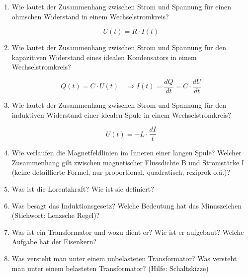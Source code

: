 
\begin{enumerate}
	\item Wie lautet der Zusammenhang zwischen Strom und Spannung für einen ohmschen Widerstand in einem Wechselstromkreis?
		\begin{solution}
			$$ U(t) = R\cdot I(t)$$
		\end{solution}
	\item Wie lautet der Zusammenhang zwischen Strom und Spannung für den kapazitiven Widerstand eines idealen Kondensators in einem Wechselstromkreis?
		\begin{solution}
			$$Q(t) = C\cdot U(t) \quad \Rightarrow I(t) = \frac{dQ}{dt} = C\cdot\frac{dU}{dt}$$
		\end{solution}
	\item Wie lautet der Zusammenhang zwischen Strom und Spannung für den induktiven Widerstand einer idealen Spule in einem Wechselstromkreis?
		\begin{solution}
			$$U(t) = -L\cdot\frac{dI}{t}$$
		\end{solution}
	\item Wie verlaufen die Magnetfeldlinien im Inneren einer langen Spule? Welcher Zusammenhang gilt zwischen magnetischer Flussdichte B und Stromstärke I (keine detaillierte Formel, nur proportional, quadratisch, reziprok o.ä.)?
	\item Was ist die Lorentzkraft? Wie ist sie definiert?
	\item Was besagt das Induktionsgesetz? Welche Bedeutung hat das Minuszeichen (Stichwort: Lenzsche Regel)?
	\item Was ist ein Transformator und wozu dient er? Wie ist er aufgebaut? Welche Aufgabe hat der Eisenkern?
	\item Was versteht man unter einem unbelasteten Transformator? Was versteht man unter einem belasteten Transformator? (Hilfe: Schaltskizze)
\end{enumerate}


